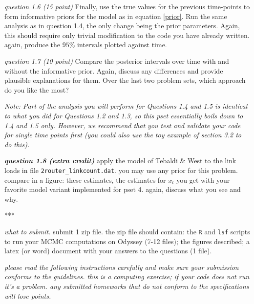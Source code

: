 \documentclass[11pt]{article}
\begin{document}
{\em question 1.6 (15 point)}
Finally, use the true values for the previous time-points to form informative priors for the model as in equation \eqref{prior}. Run the same analysis as in question 1.4, the only change being the prior parameters. Again, this should require only trivial modification to the code you have already written. again, produce the $95\%$ intervals plotted against time.

{\em question 1.7 (10 point)} 
%
Compare the posterior intervals over time with and without the informative prior. Again, discuss any differences and provide plausible explanations for them. Over the last two problem sets, which approach do you like the most?

{\em Note: Part of the analysis you will perform for Questions 1.4 and 1.5 is identical to what you did for Questions 1.2 and 1.3, so this pset essentially boils down to 1.4 and 1.5 only. However, we recommend that you test and validate your code for single time points first (you could also use the toy example of section 3.2 to do this).}

{\bf{\em question 1.8 (extra credit)}}
%
apply the model of Tebaldi \& West to the link loads in file {\tt 2router\_linkcount.dat}. you may use any prior for this problem. compare in a figure: these estimates, the estimates for $x_t$ you get with your favorite model variant implemented for pset 4. again, discuss what you see and why.


\bigskip
\centerline{*\hspace{3pt}*\hspace{3pt}*}




{\em what to submit.} 
%
submit 1 zip file. the zip file should contain: the \texttt{R} and \texttt{lsf} scripts to run your MCMC computations on Odyssey (7-12 files); the figures described; a latex (or word) document with your answers to the questions (1 file).

{\em please read the following instructions carefully and make sure your submission conforms to the guidelines. this is a computing exercise; if your code does not run it's a problem. any submitted homeworks that do not conform to the specifications will lose points.}
\end{document}
